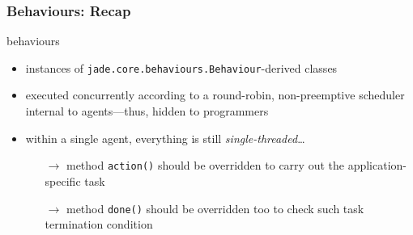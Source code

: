\documentclass{beamer}\mode<presentation>{\usetheme{AMSCesenaPurpleAndGold}}
\begin{document}
\begin{frame}\frametitle{\jade{} Behaviours: Recap}
    \begin{block}{\jade{} behaviours}
        \begin{itemize}
            \item instances of \alert{\texttt{jade.core.behaviours.Behaviour}}-derived classes
            \item executed concurrently according to a \alert{round-robin, non-preemptive} scheduler internal to agents---thus, hidden to programmers
            \item within a single agent, everything is still \emph{single-threaded}\ldots
            \begin{itemize}
                \item[$\rightarrow$] method \alert{\texttt{action()}} should be overridden to carry out the application-specific task
                \item[$\rightarrow$] method \alert{\texttt{done()}} should be overridden too to check such task termination condition
            \end{itemize}
        \end{itemize}
    \end{block}
\end{frame}
\end{document}
